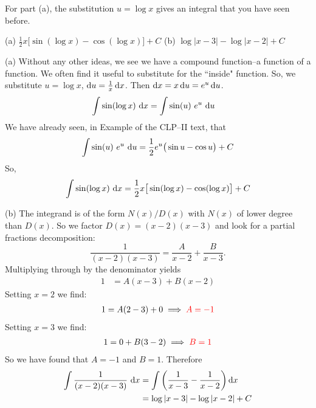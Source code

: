 \begin{hint}
For part (a), the substitution $u=\log x$ gives an integral that you
have seen before.
\end{hint}

\begin{answer} (a)
$\displaystyle \frac{1}{2} x \big[\sin(\log x) -\cos(\log x)\big]+C $
\qquad (b)
$\log |x-3| -  \log|x-2| + C $
\end{answer}

\begin{solution} (a) Without any other ideas, we see we have a compound function--a function of a function. We often find it useful to substitute for the ``inside" function. So, we
substitute $u=\log x$, $\mathrm{d}u=\frac{1}{x}\,\mathrm{d}x$. Then
$\mathrm{d}x = x\,\mathrm{d}u= e^u\,\mathrm{d}u$.
\begin{align*}
\int\sin(\log x) \ \mathrm{d}x
&=\int\sin(u)\ e^u\ \mathrm{d}u
\end{align*}
We have already seen, in Example  of
the CLP--II text, that
\begin{equation*}
\int\sin(u)\ e^u\ \mathrm{d}u
=\frac{1}{2}e^u\big(\sin u -\cos u\big)+C
\end{equation*}
So,
\begin{equation*}
\int\sin(\log x)\ \mathrm{d}x =\frac{1}{2} x \big[\sin(\log x) -\cos(\log x)\big]+C
\end{equation*}


\noindent (b)
The integrand is of the form $N(x)/D(x)$ with $N(x)$ of lower degree
than $D(x)$. So we factor $D(x)=(x-2)(x-3)$ and look for a partial fractions decomposition:
\begin{equation*}
\frac{1}{(x-2)(x-3)} = \frac{A}{x-2} + \frac{B}{x-3}.
\end{equation*}
Multiplying through by the denominator yields
\begin{align*}
1 &= A(x-3) + B(x-2)
\end{align*}
Setting $x=2$ we find:
\begin{align*}
   1 = A(2-3) + 0 \implies\color{red}  A = -1
\end{align*}
Setting $x=3$ we find:
\begin{align*}
   1 = 0 + B(3-2) \implies \color{red} B = 1
\end{align*}
So we have found that $A=-1$ and $B=1$. Therefore
\begin{align*}
  \int\frac{1}{(x-2)(x-3)}\ \mathrm{d}x
  &= \int \bigg( \frac{1}{x-3} - \frac{1}{x-2} \bigg) \,\mathrm{d}x \\
   &=  \log |x-3| -  \log|x-2| + C
\end{align*}



\end{solution}




